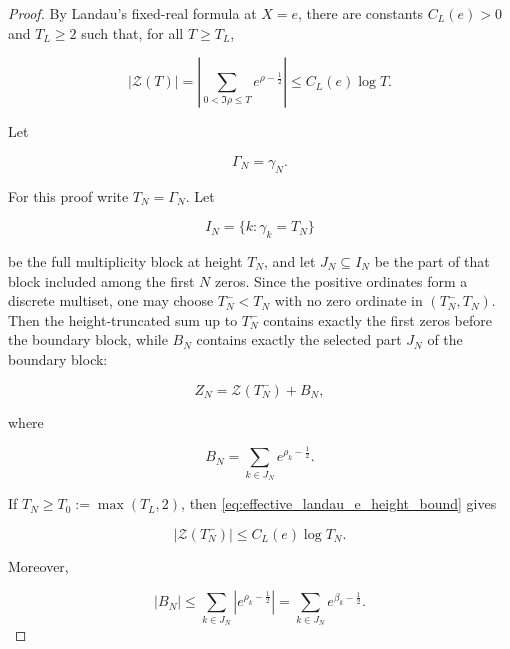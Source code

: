 \documentclass[11pt]{amsart}
\numberwithin{equation}{section}
\theoremstyle{plain}
\theoremstyle{definition}
\theoremstyle{remark}
\begin{document}
\begin{proof}
By Landau's fixed-real formula at \(X=e\), there are constants
\(C_L(e)>0\) and \(T_L\ge2\) such that, for all \(T\ge T_L\),

\begin{equation}
\left|
\mathcal Z(T)
\right|
=
\left|
\sum_{0<\Im\rho\le T}e^{\rho-\frac12}
\right|
\le
C_L(e)\log T.
\label{eq:effective_landau_e_height_bound}
\end{equation}

Let

\begin{equation}
\Gamma_N=\gamma_N.
\end{equation}

For this proof write \(T_N=\Gamma_N\). Let

\begin{equation}
I_N=\{k:\gamma_k=T_N\}
\end{equation}

be the full multiplicity block at height \(T_N\), and let
\(J_N\subseteq I_N\) be the part of that block included among the first
\(N\) zeros. Since the positive ordinates form a discrete multiset, one
may choose \(T_N^-<T_N\) with no zero ordinate in
\((T_N^-,T_N)\). Then the height-truncated sum up to \(T_N^-\)
contains exactly the first zeros before the boundary block, while
\(B_N\) contains exactly the selected part \(J_N\) of the boundary
block:

\begin{equation}
Z_N
=
\mathcal Z(T_N^-)+B_N,
\label{eq:ZN_height_bridge}
\end{equation}

where

\begin{equation}
B_N=\sum_{k\in J_N}e^{\rho_k-\frac12}.
\label{eq:boundary_block_partial_sum}
\end{equation}

If \(T_N\ge T_0:=\max(T_L,2)\), then
\eqref{eq:effective_landau_e_height_bound} gives

\begin{equation}
|\mathcal Z(T_N^-)|
\le
C_L(e)\log T_N.
\label{eq:ZN_log_TN_bound}
\end{equation}

Moreover,

\begin{equation}
|B_N|
\le
\sum_{k\in J_N}
\left|e^{\rho_k-\frac12}\right|
=
\sum_{k\in J_N}
e^{\beta_k-\frac12}.
\end{equation}


\end{proof}
\end{document}

